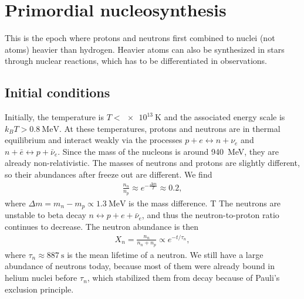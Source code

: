 \section{Primordial nucleosynthesis}

This is the epoch where protons and neutrons first combined to nuclei (not atoms) heavier than hydrogen. Heavier atoms can also be synthesized in stars through nuclear reactions, which has to be differentiated in observations.

\subsection{Initial conditions}

Initially, the temperature is $T < \SI{e13}{\kelvin}$ and the associated energy scale is $k_B T > \SI{0.8}{\MeV}$.
At these temperatures, protons and neutrons are in thermal equilibrium and interact weakly via the processes $p + e \leftrightarrow n + \nu_e$ and $n + \bar{e} \leftrightarrow p + \bar{\nu}_e$.
Since the mass of the nucleons is around \SI{940}{\MeV}, they are already non-relativistic.
The masses of neutrons and protons are slightly different, so their abundances after freeze out are different. We find
\begin{align*}
	\frac{n_n}{n_p} \approx e^{-\frac{\Delta m}{T}} \approx 0.2,
\end{align*}
where $\Delta m = m_n - m_p \propto \SI{1.3}{\MeV}$ is the mass difference.
T
The neutrons are unstable to beta decay $n \leftrightarrow p + e + \bar{\nu}_e$, and thus the neutron-to-proton ratio continues to decrease.
The neutron abundance is then
\begin{align*}
	X_n = \frac{n_n}{n_n + n_p} \propto e^{-t/\tau_n},
\end{align*}
where $\tau_n \approx \SI{887}{\second}$ is the mean lifetime of a neutron.
We still have a large abundance of neutrons today, because most of them were already bound in helium nuclei before $\tau_n$, which stabilized them from decay because of Pauli's exclusion principle.


